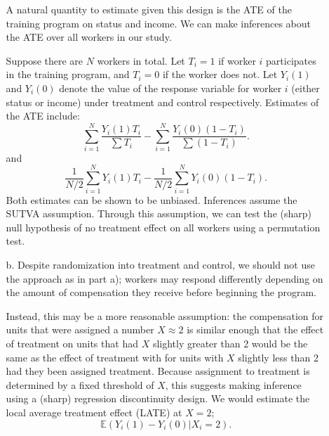 \documentclass{article}
\def\E{{\mathbb E}}
\begin{document}
\begin{itemize}
\begin{itemize}
	A natural quantity to estimate given this design is the ATE of
	the training program on status and income.  
	We can make inferences about the ATE over all workers
	in our study.
	
	Suppose there are $N$ workers in total.
	Let $T_i = 1$ if worker $i$ participates in the 
	training program, and $T_i = 0$ if the worker does not.
	Let $Y_i(1)$ and $Y_i(0)$ denote the 
	value of the response variable for worker $i$
	(either status or income) under treatment
	and control respectively.
	Estimates of the ATE include:
	\begin{equation}
		\sum_{i = 1}^N \frac{Y_i(1)T_i}{\sum T_i} - \sum_{i = 1}^N \frac{Y_i(0)(1-T_i)}{\sum(1-T_i)}.
	\end{equation}
	and
	\begin{equation}
		\frac 1 {N/2}  \sum_{i = 1}^N Y_i(1)T_i - \frac 1 {N/2} \sum_{i = 1}^N Y_i(0)(1-T_i).
	\end{equation}
	Both estimates can be shown to be unbiased.
	Inferences assume the SUTVA assumption.
	Through this assumption,
	we can test the (sharp) null hypothesis of no treatment effect
	on all workers using a permutation test.
\item[b.]	
	Despite randomization into treatment and control, 
	we should not use the approach as in part a);
	workers may respond differently depending on the
	amount of compensation they receive before beginning the program.
	
	Instead, this may be a more reasonable assumption: 
	the compensation for units that were assigned a number $X \approx 2$
	is similar enough that the effect of treatment on units that had $X$ slightly
	greater than 2 would be the same as the effect of treatment with 
	for units with $X$ slightly less than 2 had they been assigned treatment.
	Because assignment to treatment is determined by a fixed threshold of $X$, 
	this suggests making inference using a (sharp) regression discontinuity design.
	We would estimate the local average treatment effect (LATE) at $X = 2$;
	$$
		\E(Y_i(1) - Y_i(0) | X_i = 2).
	$$


\end{itemize}
\end{itemize}
\end{document}
